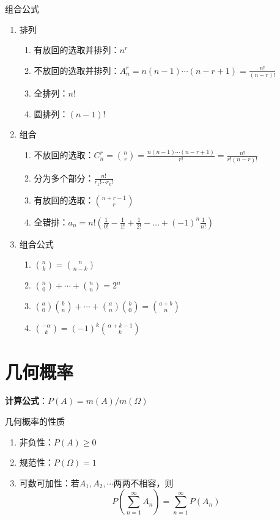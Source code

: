 \documentclass[lang = cn, scheme = chinese, thmcnt = section]{elegantbook}
\begin{document}
\begin{proposition}{组合公式}
	\begin{enumerate}
		\item 排列
		\begin{enumerate}
			\item 有放回的选取并排列：$n^r$
			\item 不放回的选取并排列：$A_n^r=n(n-1)\cdots(n-r+1)=\frac{n!}{(n-r)!}$
			\item 全排列：$n!$
			\item 圆排列：$(n-1)!$
		\end{enumerate}
		\item 组合
		\begin{enumerate}
			\item 不放回的选取：$C_n^r={n\choose r}=\frac{n(n-1)\cdots(n-r+1)}{r!}=\frac{n!}{r!(n-r)!}$
			\item 分为多个部分：$\frac{n!}{r_1!\cdots r_k!}$
			\item 有放回的选取：${n+r-1}\choose r$
			\item 全错排：$a_n=n!(\frac{1}{0!}-\frac{1}{1!}+\frac{1}{2!}-\ldots+(-1)^n\frac{1}{n!})$
		\end{enumerate}
		\item 组合公式
		\begin{enumerate}
			\item ${n\choose k}={n\choose{n-k}}$
			\item ${n\choose 0}+\cdots+{n\choose n}=2^n$
			\item ${a\choose 0}{b\choose n}+\cdots+{a\choose n}{b\choose 0}={{a+b}\choose n}$
			\item ${{-\alpha}\choose{k}}=(-1)^k{{\alpha+k-1}\choose{k}}$
		\end{enumerate}
	\end{enumerate}
\end{proposition}

\section{几何概率}

\textbf{计算公式}：$P(A)=m(A)/m(\Omega)$

\begin{proposition}{几何概率的性质}
	\begin{enumerate}
		\item 非负性：$P(A)\ge 0$
		\item 规范性：$P(\Omega)=1$
		\item 可数可加性：若$A_1,A_2,\cdots$两两不相容，则%
		$$
		P\left(\sum_{n=1}^{\infty}{A_n}\right)=\sum_{n=1}^{\infty}{P(A_n)}
		$$
	\end{enumerate}
\end{proposition}
\end{document}
